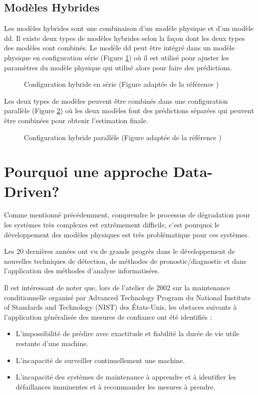 \subsection{Modèles Hybrides}
Les modèles hybrides sont une combinaison d'un modèle physique et d'un modèle \acrlong{dd}. Il existe deux types de modèles hybrides selon la façon dont les deux types des modèles sont combinés. Le modèle \acrlong{dd} peut être intégré dans un modèle physique en configuration série (Figure \ref{fig:hybrid-approach-series}) où il est utilisé pour ajuster les paramètres du modèle physique qui utilisé alors pour faire des prédictions.

\begin{figure}[H]
    \centering
    
    \caption{Configuration hybride en série (Figure adaptée de la référence \cite{Mangili2013})}
    \label{fig:hybrid-approach-series}
\end{figure}

Les deux types de modèles peuvent être combinés dans une configuration parallèle (Figure \ref{fig:hybrid-approach-parallel}) où les deux modèles font des prédictions séparées qui peuvent être combinées pour obtenir l'estimation finale.
\begin{figure}[H]
    \centering
    
    \caption{Configuration hybride parallèle (Figure adaptée de la référence \cite{Mangili2013})}
    \label{fig:hybrid-approach-parallel}
\end{figure}

\section{Pourquoi une approche Data-Driven?}
Comme mentionné précédemment, comprendre le processus de dégradation pour les systèmes très complexes est extrêmement difficile, c'est pourquoi le développement des modèles physiques est très problématique pour ces systèmes.

Les 20 dernières années ont vu de grands progrès dans le développement de nouvelles techniques de détection, de méthodes de pronostic/diagnostic et dans l’application des méthodes d’analyse informatisées. 

Il est intéressant de noter que, lors de l’atelier de 2002 sur la maintenance conditionnelle organisé par Advanced Technology Program du National Institute of Standards and Technology (NIST) des États-Unis, les obstaces suivants à l’application généralisée des mesures de confiance ont été identifiés :
\begin{itemize}%
    \item L’impossibilité de prédire avec exactitude et fiabilité la durée de vie utile restante d'une machine.
    \item L’incapacité de surveiller continuellement une machine.
    \item L’incapacité des systèmes de maintenance à apprendre et à identifier les défaillances imminentes et à recommander les mesures à prendre.
\end{itemize} 

